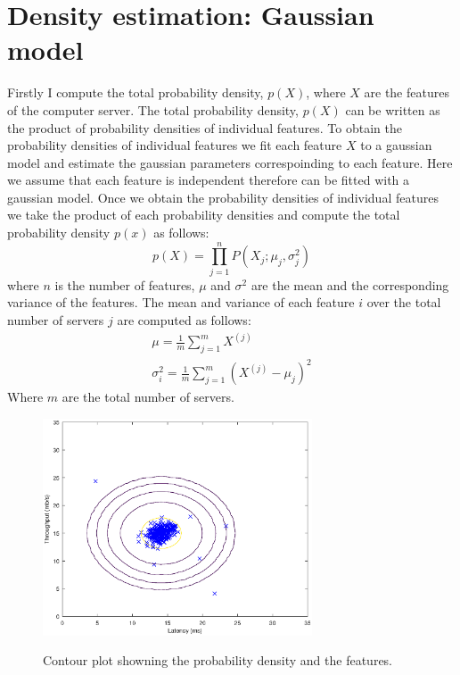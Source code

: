 \documentclass[twocolumn]{article}
\begin{document}
		\section{Density estimation: Gaussian model}
		Firstly I compute the total probability density, $p(X)$, where $X$ are the features of the computer server. The total probability density, $p(X)$ can be written as the product of probability densities of individual features. To obtain the probability densities of individual features we fit each feature $X$ to a gaussian model and estimate the gaussian parameters correspoinding to each feature. Here we assume that each feature is independent therefore can be fitted with a gaussian model. Once we obtain the probability densities of individual features we take the product of each probability densities and compute the total probability density $p(x)$ as follows:
		\begin{equation}
			p(X) = \prod_{j=1}^{n}P(X_j;\mu_j,\sigma^2_j)
		\end{equation}
		where $n$ is the number of features, $\mu$ and $\sigma^2$ are the mean and the corresponding variance of the features. The mean and variance of each feature $i$ over the total number of servers $j$ are computed as follows:
		\begin{align}
			\mu = \frac{1}{m}\sum_{j=1}^{m}X^{(j)} \\
			\sigma^2_i = \frac{1}{m}\sum_{j=1}^m (X^{(j)} - \mu_j)^2
		\end{align}
			Where $m$ are the total number of servers.  
                \begin{figure}
                \centering
                \includegraphics[clip=true,trim=0cm 0cm 0cm 0cm,width=8cm]{contour.ps}\\
			\caption{Contour plot showning the probability density and the features.}
                \label{fig:dataset}
                \end{figure}
\end{document}
